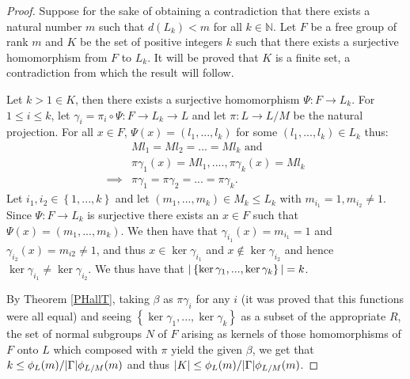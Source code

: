\begin{proof}
    Suppose for the sake of obtaining a contradiction that there exists a natural number $m$ such that $d(L_k)<m$ for all $k \in \mathbb{N}$.
    Let $F$ be a free group of rank $m$ and $K$ be the set of positive integers $k$ such that there exists a surjective homomorphism from $F$ to $L_k$. 
    It will be proved that $K$ is a finite set, a contradiction from which the result will follow.

    Let $k > 1 \in K$, then there exists a surjective homomorphism $\Psi : F \rightarrow L_k$. For $1 \le i \le k$, let $\gamma_i = \pi_i \circ \Psi : F \rightarrow L_k \rightarrow L$ and let $\pi : L \rightarrow L/M$ be the natural projection. For all $x \in F$, $\Psi(x) = (l_1,...,l_k)$ for some $(l_1,...,l_k) \in L_k$ thus:
    \begin{align*}
        &Ml_1 = Ml_2 = ... = Ml_k \text{ and } \\
        &\pi\gamma_1(x) = Ml_1, .... , \pi\gamma_k(x) = Ml_k \\
        \implies &\pi\gamma_1 = \pi\gamma_2 = ... = \pi\gamma_k.
    \end{align*}
    Let $i_1, i_2 \in \left\{ 1, ..., k \right\}$ and let $(m_1,..., m_k) \in M_k \le L_k$ with $m_{i_1} = 1, m_{i_2} \ne 1.$ Since $\Psi : F \rightarrow L_k$ is surjective there exists an $x \in F$ such that $\Psi(x) = (m_1,..., m_k)$. 
    We then have that $\gamma_{i_1}(x) = m_{i_1} = 1$ and $\gamma_{i_2}(x) = m_{i2} \ne 1$, and thus $x \in \ker \gamma_{i_1}$ and $x \notin \ker \gamma_{i_2}$ and hence $\ker \gamma_{i_1} \ne \ker \gamma_{i_2}$. We thus have that $| \left\{ \ker \gamma_{1}, ..., \ker \gamma_{k} \right\} | = k$. 
    
    By Theorem \ref{PHallT}, taking $\beta$ as $\pi\gamma_i$ for any $i$ (it was proved that this functions were all equal) and seeing $\left\{ \ker \gamma_{1}, ..., \ker \gamma_{k} \right\}$ as a subset of the appropriate $R$, the set of normal subgroups $N$ of $F$ arising as kernels of those homomorphisms of $F$ onto $L$ which composed with $\pi$ yield the given $\beta$, we get that $k \le \phi_L(m)/| \Gamma |\phi_{L/M}(m)$ and thus $| K | \le \phi_L(m)/| \Gamma |\phi_{L/M}(m)$.
\end{proof}